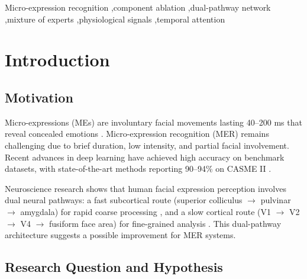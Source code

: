 \documentclass[preprint,12pt,authoryear]{elsarticle}
\begin{document}
\begin{frontmatter}
\begin{abstract}
\textbf{Contributions}: (1) Quantified component contributions through 6-variant ablation; (2) Documented failure configurations to prevent redundant community effort; (3) Reproducible LOSO baseline with complete per-fold results; (4) MER-specific training guidelines derived from empirical failures.
\end{abstract}

\begin{keyword}
Micro-expression recognition \sep component ablation \sep dual-pathway network \sep mixture of experts \sep physiological signals \sep temporal attention
\end{keyword}

\end{frontmatter}

\linenumbers

\section{Introduction}

\subsection{Motivation}

Micro-expressions (MEs) are involuntary facial movements lasting 40--200 ms that reveal concealed emotions \cite{ekman1969nonverbal}. Micro-expression recognition (MER) remains challenging due to brief duration, low intensity, and partial facial involvement. Recent advances in deep learning have achieved high accuracy on benchmark datasets, with state-of-the-art methods reporting 90--94\% on CASME II \cite{chen2024multiscale,ma2024hybrid}.

Neuroscience research shows that human facial expression perception involves dual neural pathways: a fast subcortical route (superior colliculus $\rightarrow$ pulvinar $\rightarrow$ amygdala) for rapid coarse processing \cite{morris1999subcortical}, and a slow cortical route (V1 $\rightarrow$ V2 $\rightarrow$ V4 $\rightarrow$ fusiform face area) for fine-grained analysis \cite{kanwisher1997fusiform}. This dual-pathway architecture suggests a possible improvement for MER systems.

\subsection{Research Question and Hypothesis}
\end{document}
